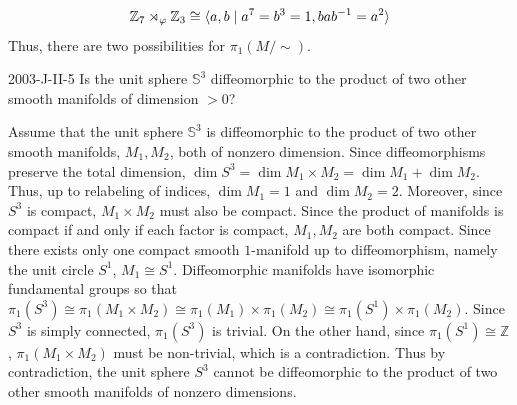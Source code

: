 \documentclass{article}
\begin{document}
\begin{enumerate}[itemsep =-2pt,label = (\alph{*})]
		\begin{equation*}
			\mathbb{Z}_{7} \rtimes_{\varphi}\mathbb{Z}_{3} \cong \braket{a, b \mid a^{7} = b^{3} = 1, bab^{-1} = a^{2}}
		\end{equation*}
		Thus, there are two possibilities for $\pi_{1}(M/\sim)$. 
	\end{enumerate}
	
	\begin{prb}{2003-J-II-5}
		Is the unit sphere $\mathbb{S}^{3}$ diffeomorphic to the product of two other smooth manifolds of dimension $> 0$? 
	\end{prb}
	Assume that the unit sphere $\mathbb{S}^{3}$ is diffeomorphic to the product of two other smooth manifolds, $M_{1}, M_{2}$, both of nonzero dimension. Since diffeomorphisms preserve the total dimension, $\dim{S^{3}} = \dim{M_{1} \times M_{2}} = \dim{M_{1}} + \dim{M_{2}}$. Thus, up to relabeling of indices, $\dim{M_{1}} = 1$ and $\dim{M_{2}} = 2$. Moreover, since $S^{3}$ is compact, $M_{1} \times M_{2}$ must also be compact. Since the product of manifolds is compact if and only if each factor is compact, $M_{1}, M_{2}$ are both compact. Since there exists only one compact smooth $1$-manifold up to diffeomorphism, namely the unit circle $S^{1}$, $M_{1} \cong S^{1}$. Diffeomorphic manifolds have isomorphic fundamental groups so that $\pi_{1}(S^{3}) \cong \pi_{1}(M_{1} \times M_{2}) \cong \pi_{1}(M_{1}) \times \pi_{1}(M_{2}) \cong \pi_{1}(S^{1}) \times \pi_{1}(M_{2})$. Since $S^{3}$ is simply connected, $\pi_{1}(S^{3})$ is trivial. On the other hand, since $\pi_{1}(S^{1}) \cong \mathbb{Z}$, $\pi_{1}(M_{1} \times M_{2})$ must be non-trivial, which is a contradiction. Thus by contradiction, the unit sphere $S^{3}$ cannot be diffeomorphic to the product of two other smooth manifolds of nonzero dimensions. 
	
\end{document}
